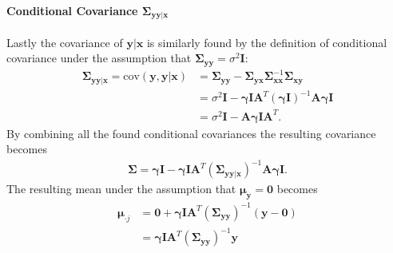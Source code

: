 \paragraph{Conditional Covariance $\boldsymbol{\Sigma}_{\mathbf{yy} \vert \mathbf{x}}$}
Lastly the covariance of $\mathbf{y} \vert \mathbf{x}$ is similarly found by the definition of conditional covariance under the assumption that $\boldsymbol{\Sigma}_{\mathbf{yy}} = \sigma^2 \mathbf{I}$:
\begin{align*}
\boldsymbol{\Sigma}_{\mathbf{yy} \vert \mathbf{x}} =  \text{cov} ( \mathbf{y} , \mathbf{y} \vert \mathbf{x}) &= \boldsymbol{\Sigma}_{\mathbf{yy}} - \boldsymbol{\Sigma}_{\mathbf{yx}} \boldsymbol{\Sigma}_{\mathbf{xx}}^{-1} \boldsymbol{\Sigma}_{\mathbf{xy}} \\
&= \sigma^2 \mathbf{I} - \boldsymbol{\gamma} \mathbf{I} \mathbf{A}^T (\boldsymbol{\gamma} \mathbf{I})^{-1} \mathbf{A} \boldsymbol{\gamma} \mathbf{I} \\
&= \sigma^2 \mathbf{I} - \mathbf{A} \boldsymbol{\gamma}\mathbf{I} \mathbf{A}^T.
\end{align*} 
By combining all the found conditional covariances the resulting covariance becomes 
\begin{align*}
\boldsymbol{\Sigma} = \boldsymbol{\gamma} \mathbf{I} - \boldsymbol{\gamma} \mathbf{I} \mathbf{A}^T (\boldsymbol{\Sigma}_{\mathbf{yy} \vert \mathbf{x}})^{-1} \mathbf{A} \boldsymbol{\gamma} \mathbf{I}.
\end{align*}
The resulting mean under the assumption that $\boldsymbol{\mu}_{\mathbf{y}} = \mathbf{0}$ becomes
\begin{align*}
\boldsymbol{\mu}_{\cdot j} &= \mathbf{0} + \boldsymbol{\gamma} \mathbf{I} \mathbf{A}^T \left( \boldsymbol{\Sigma}_{\mathbf{yy}} \right)^{-1} \left(\mathbf{y} - \mathbf{0}\right) \\
&= \boldsymbol{\gamma} \mathbf{I} \mathbf{A}^T \left( \boldsymbol{\Sigma}_{\mathbf{yy}} \right)^{-1} \mathbf{y}
\end{align*}  
